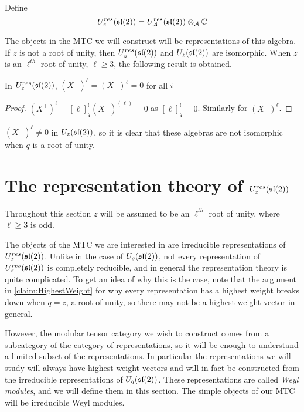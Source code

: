 Define 
\begin{equation}
    U_z^{res}(\mathfrak{sl}(2)) = U_\mathcal{A}^{res}(\mathfrak{sl}(2)) \otimes_\mathcal{A} \mathbb{C}
\end{equation}

The objects in the MTC we will construct will be representations of this
algebra.  If $z$ is not a root of unity, then $U_z^{res}(\mathfrak{sl}(2))$ and
$U_z(\mathfrak{sl}(2))$ are isomorphic. When $z$ is an $\ell^{th}$ root of unity, $\ell
\geq 3$, the following result is obtained.

\begin{lemma}
    In $U_z^{res}(\mathfrak{sl}(2))$, $ (X^+)^\ell = (X^-)^\ell = 0$ for all $i$
\end{lemma}
\begin{proof}
    $ (X^+)^\ell = [\ell]_{q}^!  (X^+)^{(\ell)} = 0$ as $[\ell]_{q}^! = 0$. Similarly for $(X^-)^\ell$.
\end{proof}

$(X^+)^\ell \neq 0$ in $U_z(\mathfrak{sl}(2))$, so it is clear that these algebras are
not isomorphic when $q$ is a root of unity. 

\section{The representation theory of $U_z^{res}(\mathfrak{sl}(2))$}
\label{section:RepTheoryofResSL2}


Throughout this section $z$ will be assumed to be an $\ell^{th}$ root of unity, where $\ell \geq 3$ is odd.

The objects of the MTC we are interested in are irreducible representations of
$U_z^{res}(\mathfrak{sl}(2))$. Unlike in the case of $U_q(\mathfrak{sl}(2))$, not every
representation of $U_z^{res}(\mathfrak{sl}(2))$ is completely reducible, and in general
the representation theory is quite complicated. To get an idea of why this is
the case, note that the argument in \ref{claim:HighestWeight} for why every
representation has a highest weight breaks down when $q=z$, a root of unity,
so there may not be a highest weight vector in general. 

However, the modular tensor category we wish to construct comes from a
subcategory of the category of representations, so it will be enough to
understand a limited subset of the representations.  In particular the
representations we will study will always have highest weight vectors and will
in fact be constructed from the irreducible representations of $U_q(\mathfrak{sl}(2))$.
These representations are called  \emph{Weyl modules}, and we will define them
in this section. The simple objects of our MTC will be irreducible Weyl modules. 

